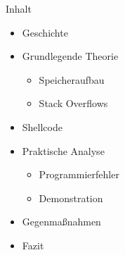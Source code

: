 \begin{frame}{Inhalt}
    \begin{itemize}
        \item Geschichte
        \item Grundlegende Theorie
        \begin{itemize}
            \item Speicheraufbau
            \item Stack Overflows
        \end{itemize}
        \item Shellcode
        \item Praktische Analyse
        \begin{itemize}
            \item Programmierfehler
            \item Demonstration
        \end{itemize}
        \item Gegenmaßnahmen
        \item Fazit
    \end{itemize}
\end{frame}
